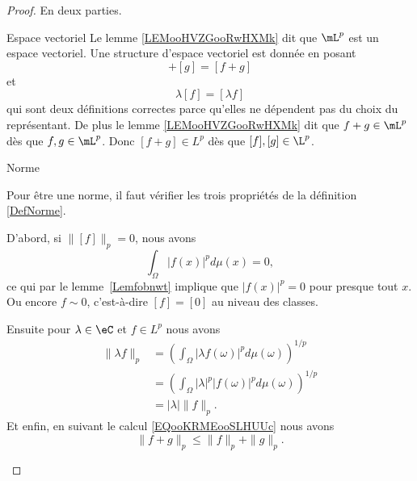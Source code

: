\begin{proof}

    En deux parties.
    \begin{subproof}
        \item[Espace vectoriel]
            Le lemme \ref{LEMooHVZGooRwHXMk} dit que \( \mL^p\) est un espace vectoriel. Une structure d'espace vectoriel est donnée en posant
            \begin{equation}
                [f]+[g]=[f+g]
            \end{equation}
            et
            \begin{equation}
                \lambda[f]=[\lambda f]
            \end{equation}
            qui sont deux définitions correctes parce qu'elles ne dépendent pas du choix du représentant. De plus le lemme \ref{LEMooHVZGooRwHXMk} dit que \( f+g\in \mL^p\) dès que \( f,g\in \mL^p\). Donc \( [f+g]\in L^p\) dès que \( [f],[g]\in \L^p\).
        \item[Norme]
             
            Pour être une norme, il faut vérifier les trois propriétés de la définition \ref{DefNorme}.

            D'abord, si \( \| [f] \|_p=0\), nous avons
            \begin{equation}
                \int_{\Omega}| f(x) |^pd\mu(x)=0,
            \end{equation}
            ce qui par le lemme~\ref{Lemfobnwt} implique que \( | f(x) |^p=0\) pour presque tout \( x\). Ou encore \( f\sim 0\), c'est-à-dire \( [f]=[0]\) au niveau des classes. 
        
            Ensuite pour \( \lambda\in \eC\) et \( f\in L^p\) nous avons
            \begin{subequations}
                \begin{align}
                    \| \lambda f \|_p&=\left( \int_{\Omega}| \lambda f(\omega) |^pd\mu(\omega) \right)^{1/p}\\
                    &=\left( \int_{\Omega}| \lambda |^p| f(\omega) |^pd\mu(\omega) \right)^{1/p}\\
                    &=| \lambda |\| f \|_p.
                \end{align}
            \end{subequations}
            Et enfin, en suivant le calcul \eqref{EQooKRMEooSLHUUc} nous avons
            \begin{equation}
                \| f+g \|_p\leq \| f \|_p+\| g \|_p.
            \end{equation}
    \end{subproof}
\end{proof}

